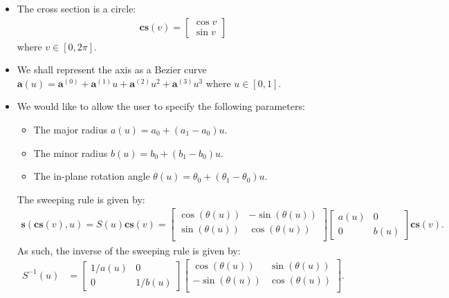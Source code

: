 \documentclass[10pt]{article}
\newcommand{\ve}[1]{\bm{#1}}
\begin{document}
\begin{itemize}
  \item The cross section is a circle:
    \begin{align*}
      \ve{cs}(v) = \begin{bmatrix}
        \cos v\\
        \sin v
      \end{bmatrix}
    \end{align*}
    where $v \in [0, 2\pi]$.
    
  \item We shall represent the axis as a Bezier curve $\ve{a}(u) = \ve{a}^{(0)} + \ve{a}^{(1)}u + \ve{a}^{(2)} u^2 + \ve{a}^{(3)} u^3$ where $u \in [0,1]$.
    
  \item We would like to allow the user to specify the following parameters:
    \begin{itemize}
      \item The major radius  $a(u) = a_0 + (a_1 - a_0)u$.
      \item The minor radius $b(u) = b_0 + (b_1 - b_0)u$.
      \item The in-plane rotation angle $\theta(u) = \theta_0 + (\theta_1 - \theta_0)u$.
    \end{itemize}
    The sweeping rule is given by:
    \begin{align*}
      \ve{s}(\ve{cs}(v), u) = S(u)\ve{cs}(v) =
      \begin{bmatrix}
        \cos(\theta(u)) & -\sin(\theta(u))\\
        \sin(\theta(u)) &  \cos(\theta(u))\\
      \end{bmatrix}
      \begin{bmatrix}
        a(u) & 0\\
        0 & b(u)
      \end{bmatrix}
      \ve{cs}(v).
    \end{align*}
    As such, the inverse of the sweeping rule is given by:
    \begin{align*}
      S^{-1}(u) &=
      \begin{bmatrix}
        1/a(u) & 0\\
        0 & 1/b(u)
      \end{bmatrix}
      \begin{bmatrix}
         \cos(\theta(u)) &   \sin(\theta(u))\\
        -\sin(\theta(u)) &  \cos(\theta(u))\\
      \end{bmatrix}.
    \end{align*}
    

\end{itemize}
\end{document}
